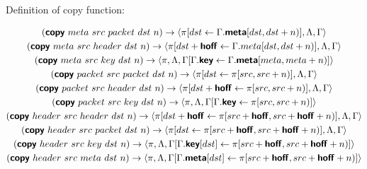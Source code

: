 Definition of copy function:
\begin{mdframed}
\begin{gather*}
  (\bm{\mathsf{{copy}}}  \ meta \ src \ packet \ dst \ n)
  \rightarrow
  \langle \pi[dst \leftarrow \Gamma.\bm{\mathsf{{meta}}}[dst, dst + n)],
  \Lambda, \Gamma \rangle
\\
  (\bm{\mathsf{{copy}}} \ meta \ src \ header \ dst \ n)
  \rightarrow
  \langle \pi[dst + \bm{\mathsf{{hoff}}} \leftarrow \Gamma.meta[dst, dst + n)],
  \Lambda, \Gamma \rangle
\\
  (\bm{\mathsf{{copy}}} \ meta \ src \ key \ dst \ n)
  \rightarrow
  \langle \pi, \Lambda, \Gamma[\Gamma.\bm{\mathsf{{key}}} \leftarrow
  \Gamma.\bm{\mathsf{{meta}}}[meta, meta + n)] \rangle
\\
  (\bm{\mathsf{{copy}}} \ packet \ src \ packet \ dst \ n)
  \rightarrow
  \langle \pi[dst \leftarrow \pi[src, src + n)], \Lambda, \Gamma \rangle
\\ 
  (\bm{\mathsf{{copy}}} \ packet \ src \ header \ dst \ n)
  \rightarrow
  \langle \pi[dst + \bm{\mathsf{{hoff}}} \leftarrow
  \pi[src, src + n)],
  \Lambda, \Gamma \rangle
\\ 
  (\bm{\mathsf{{copy}}} \ packet \ src \ key \ dst \ n)
  \rightarrow
  \langle \pi, \Lambda, \Gamma[\Gamma.\bm{\mathsf{{key}}} \leftarrow \pi[src, src + n)]
  \rangle
\\
  (\bm{\mathsf{{copy}}} \ header \ src \ header \ dst \ n)
  \rightarrow
  \langle \pi[dst + \bm{\mathsf{{hoff}}} \leftarrow
  \pi[src + \bm{\mathsf{{hoff}}}, src + \bm{\mathsf{{hoff}}} + n)],
  \Lambda, \Gamma \rangle
\\
  (\bm{\mathsf{{copy}}} \ header \ src \ packet \ dst \ n)
  \rightarrow
  \langle \pi[dst \leftarrow
  \pi[src + \bm{\mathsf{{hoff}}}, src +
  \bm{\mathsf{{hoff}}} + n)], \Lambda, \Gamma \rangle
\\
  (\bm{\mathsf{{copy}}} \ header \ src \ key \ dst \ n)
  \rightarrow
  \langle \pi, \Lambda, \Gamma[\Gamma.\bm{\mathsf{{key}}}[dst] \leftarrow
  \pi[src + 
  \bm{\mathsf{{hoff}}}, src + \bm{\mathsf{{hoff}}} + n)] \rangle
\\
  (\bm{\mathsf{{copy}}} \ header \ src \ meta \ dst \ n)
  \rightarrow
  \langle \pi, \Lambda, \Gamma[\Gamma.\bm{\mathsf{{meta}}}[dst] \leftarrow
  \pi[src + 
  \bm{\mathsf{{hoff}}}, src + \bm{\mathsf{{hoff}}} + n)] \rangle
\end{gather*}
\end{mdframed}

